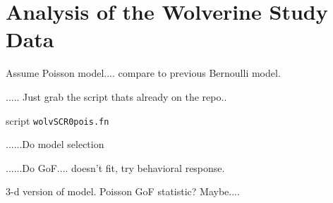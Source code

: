 \section{Analysis of the Wolverine Study Data}

Assume Poisson model.... compare to previous Bernoulli model. 

..... Just grab the script thats already on the repo..

script \mbox{\tt wolvSCR0pois.fn}

......Do model selection

......Do GoF.... doesn't fit, try behavioral response. 

3-d version of model. Poisson GoF statistic? Maybe....

